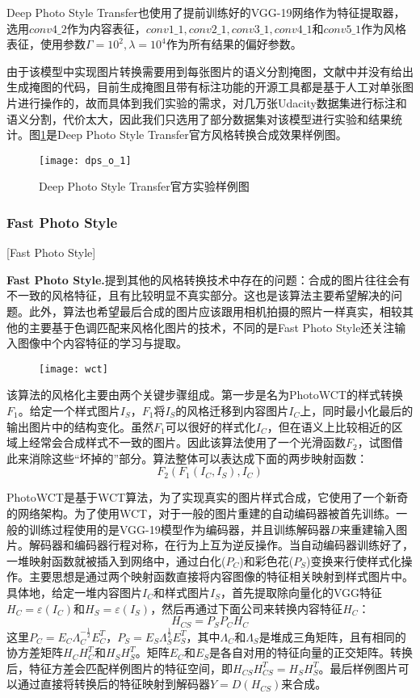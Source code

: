 Deep Photo Style Transfer也使用了提前训练好的VGG-19\cite{vgg-19}网络作为特征提取器，选用$conv4\_2$作为内容表征，$conv1\_1,conv2\_1,conv3\_1,conv4\_1$和$conv5\_1$作为风格表征，使用参数$\Gamma=10^2,\lambda=10^4$作为所有结果的偏好参数。

由于该模型中实现图片转换需要用到每张图片的语义分割掩图，文献\cite{dpst}中并没有给出生成掩图的代码，目前生成掩图且带有标注功能的开源工具都是基于人工对单张图片进行操作的，故而具体到我们实验的需求，对几万张Udacity数据集进行标注和语义分割，代价太大，因此我们只选用了部分数据集对该模型进行实验和结果统计。图\ref{fig:dps}是Deep Photo Style Transfer官方风格转换合成效果样例图。

\begin{figure}[h]
    \centering
    \texttt{[image: dps\_o\_1]}
    \caption{Deep Photo Style Transfer官方实验样例图}
    \label{fig:dps}
\end{figure}


\subsubsection{Fast Photo Style}[Fast Photo Style]

\textbf{Fast Photo Style.}\cite{fps}\quad  提到其他的风格转换技术中存在的问题：合成的图片往往会有不一致的风格特征，且有比较明显不真实部分。这也是该算法主要希望解决的问题。此外，算法也希望最后合成的图片应该跟用相机拍摄的照片一样真实，相较其他的主要基于色调匹配来风格化图片的技术，不同的是Fast Photo Style还关注输入图像中个内容特征的学习与提取。

\begin{figure}[t]
    \centering
    \texttt{[image: wct]}
    \caption{}
    \label{wctf}
\end{figure}

该算法的风格化主要由两个关键步骤组成。第一步是名为PhotoWCT的样式转换$F_1$。给定一个样式图片$I_S$，$F_1$将$I_S$的风格迁移到内容图片$I_C$上，同时最小化最后的输出图片中的结构变化。虽然$F_1$可以很好的样式化$I_C$，但在语义上比较相近的区域上经常会合成样式不一致的图片。因此该算法使用了一个光滑函数$F_2$，试图借此来消除这些“坏掉的”部分。算法整体可以表达成下面的两步映射函数：
$$F_2(F_1(I_C,I_S),I_C)$$

PhotoWCT是基于WCT\cite{wctp}算法，为了实现真实的图片样式合成，它使用了一个新奇的网络架构。为了使用WCT，对于一般的图片重建的自动编码器被首先训练。一般的训练过程使用的是VGG-19模型作为编码器\varepsilon，并且训练解码器$D$来重建输入图片。解码器和编码器行程对称，在行为上互为逆反操作。当自动编码器训练好了，一堆映射函数就被插入到网络中，通过白化($P_C$)和彩色花($P_S$)变换来行使样式化操作。主要思想是通过两个映射函数直接将内容图像的特征相关映射到样式图片中。具体地，给定一堆内容图片$I_C$和样式图片$I_S$，首先提取除向量化的VGG特征$H_C=\varepsilon(I_C)$和$H_S=\varepsilon(I_S)$，然后再通过下面公司来转换内容特征$H_C$：
$$H_{CS}=P_SP_CH_C$$
这里$P_C=E_C\Lambda_C^{-\frac{1}{2}}E_C^T$，$P_S=E_S\Lambda_S^{\frac{1}{2}}E_S^T$，其中$\Lambda_C$和$\Lambda_S$是堆成三角矩阵，且有相同的协方差矩阵$H_CH_C^T$和$H_SH_S^T$。矩阵$E_C$和$E_S$是各自对用的特征向量的正交矩阵。转换后，特征方差会匹配样例图片的特征空间，即$H_{CS}H_{CS}^T=H_SH_S^T$。最后样例图片可以通过直接将转换后的特征映射到解码器$Y=D(H_{CS})$来合成。

